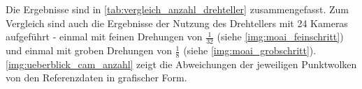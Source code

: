\documentclass[./00PhotoBox.tex]{subfiles}
\begin{document}
Die Ergebnisse sind in \autoref{tab:vergleich_anzahl_drehteller} zusammengefasst. Zum Vergleich sind auch die Ergebnisse der Nutzung des Drehtellers mit 24 Kameras aufgeführt - einmal mit feinen Drehungen von $\frac{1}{32}$ (siehe \autoref{img:moai_feinschritt}) und einmal mit groben Drehungen von $\frac{1}{8}$ (siehe \autoref{img:moai_grobschritt}). \autoref{img:ueberblick_cam_anzahl} zeigt die Abweichungen der jeweiligen Punktwolken von den Referenzdaten in grafischer Form.

\begin{table}
    \centering
    \caption{Ergebnisse mit unterschiedlicher Kameraanzahl und teilweise Nutzung eines Drehtellers}
    \label{tab:vergleich_anzahl_drehteller}
\end{table}
\end{document}

